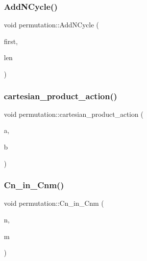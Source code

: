 \mbox{\label{classpermutation_a0228b471531a836ef8fa92998cd34c57}} 
\subsubsection{\texorpdfstring{Add\+N\+Cycle()}{AddNCycle()}}
{\footnotesize\ttfamily void permutation\+::\+Add\+N\+Cycle (\begin{DoxyParamCaption}\item[{\mbox{\hyperlink{galois_8h_a09fddde158a3a20bd2dcadb609de11dc}{I\+NT}}}]{first,  }\item[{\mbox{\hyperlink{galois_8h_a09fddde158a3a20bd2dcadb609de11dc}{I\+NT}}}]{len }\end{DoxyParamCaption})}

\mbox{\label{classpermutation_ad4e25c696e47457b84481f528a4d4d8e}} 
\subsubsection{\texorpdfstring{cartesian\+\_\+product\+\_\+action()}{cartesian\_product\_action()}}
{\footnotesize\ttfamily void permutation\+::cartesian\+\_\+product\+\_\+action (\begin{DoxyParamCaption}\item[{\mbox{\hyperlink{classpermutation}{permutation}} \&}]{a,  }\item[{\mbox{\hyperlink{classpermutation}{permutation}} \&}]{b }\end{DoxyParamCaption})}

\mbox{\label{classpermutation_a42c6adacfca83d855da8a2a38e300057}} 
\subsubsection{\texorpdfstring{Cn\+\_\+in\+\_\+\+Cnm()}{Cn\_in\_Cnm()}}
{\footnotesize\ttfamily void permutation\+::\+Cn\+\_\+in\+\_\+\+Cnm (\begin{DoxyParamCaption}\item[{\mbox{\hyperlink{galois_8h_a09fddde158a3a20bd2dcadb609de11dc}{I\+NT}}}]{n,  }\item[{\mbox{\hyperlink{galois_8h_a09fddde158a3a20bd2dcadb609de11dc}{I\+NT}}}]{m }\end{DoxyParamCaption})}

